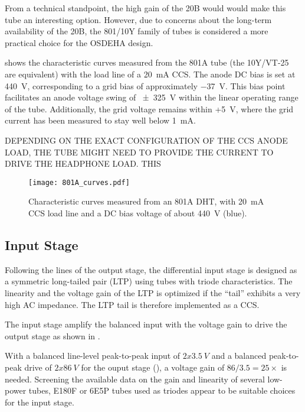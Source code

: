 From a technical standpoint, the high gain of the 20B would would make this tube an interesting option. However, due to concerns about the long-term availability of the 20B, the 801/10Y family of tubes is considered a more practical choice for the OSDEHA design.

 shows the characteristic curves measured from the 801A tube (the 10Y/VT-25 are equivalent) with the load line of a \SI{20}{mA} CCS. The anode DC bias is set at \SI{440}{V}, corresponding to a grid bias of approximately \SI{-37}{V}. This bias point facilitates an anode voltage swing of \SI{\pm325}{V} within the linear operating range of the tube. Additionally, the grid voltage remains within +\SI{5}{V}, where the grid current has been measured to stay well below \SI{1}{mA}.


DEPENDING ON THE EXACT CONFIGURATION OF THE CCS ANODE LOAD, THE TUBE MIGHT NEED TO PROVIDE THE CURRENT TO DRIVE THE HEADPHONE LOAD. THIS 


\begin{figure}
\begin{center}
\texttt{[image: 801A\_curves.pdf]}
\caption{Characteristic curves measured from an 801A DHT, with \SI{20}{mA} CCS load line and a DC bias voltage of about \SI{440}{V} (blue).}
\end{center}
\end{figure}


\subsection{Input Stage}
Following the lines of the output stage, the differential input stage is designed as a symmetric long-tailed pair (LTP)\cite{valvewizard_LTP} using tubes with triode characteristics. The linearity and the voltage gain of the LTP is optimized if the ``tail'' exhibits a very high AC impedance. The LTP tail is therefore implemented as a CCS.

The input stage amplify the balanced input with the voltage gain to drive the output stage as shown in . 

With a balanced line-level peak-to-peak input of $2 x \SI{3.5}{V}$ and a balanced peak-to-peak drive of $2 x \SI{86}{V}$ for the ouput stage (), a voltage gain of $86 / 3.5 = 25\times$ is needed. Screening the available data on the gain and linearity\cite{bartola_thdbenchmark,millett_pentodes,klausmobile_testerfiles} of several low-power tubes, E180F or 6E5P tubes used as triodes appear to be suitable choices for the input stage.


